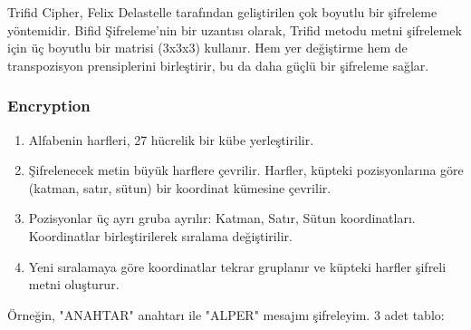 Trifid Cipher, Felix Delastelle tarafından geliştirilen çok boyutlu bir şifreleme yöntemidir. Bifid Şifreleme'nin bir uzantısı olarak, Trifid metodu metni şifrelemek için üç boyutlu bir matrisi (3x3x3) kullanır. Hem yer değiştirme hem de transpozisyon prensiplerini birleştirir, bu da daha güçlü bir şifreleme sağlar.

\subsubsection{Encryption}

\begin{enumerate}
    \item Alfabenin harfleri, 27 hücrelik bir kübe yerleştirilir.
    \item Şifrelenecek metin büyük harflere çevrilir. Harfler, küpteki pozisyonlarına göre (katman, satır, sütun) bir koordinat kümesine çevrilir.
    \item Pozisyonlar üç ayrı gruba ayrılır: Katman, Satır, Sütun koordinatları. Koordinatlar birleştirilerek sıralama değiştirilir.
    \item Yeni sıralamaya göre koordinatlar tekrar gruplanır ve küpteki harfler şifreli metni oluşturur.
\end{enumerate}

Örneğin, "ANAHTAR" anahtarı ile "ALPER" mesajını şifreleyim. 3 adet tablo:

\begin{table}[ht]
\centering
{}
\end{table}

\begin{table}[ht]
\centering
{}
\end{table}

